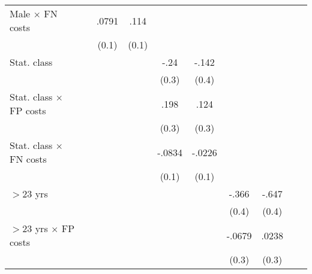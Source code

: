 \begin{table}[htbp]
\begin{tabular}{l*{9}{c}}
Male $\times$ FN costs&                  &    .0791         &     .114         &                  &                  &                  &                  &                  &                  \\
                &                  &    (0.1)         &    (0.1)         &                  &                  &                  &                  &                  &                  \\
Stat. class     &                  &                  &                  &     -.24         &    -.142         &                  &                  &                  &                  \\
                &                  &                  &                  &    (0.3)         &    (0.4)         &                  &                  &                  &                  \\
Stat. class $\times$ FP costs&                  &                  &                  &     .198         &     .124         &                  &                  &                  &                  \\
                &                  &                  &                  &    (0.3)         &    (0.3)         &                  &                  &                  &                  \\
Stat. class $\times$ FN costs&                  &                  &                  &   -.0834         &   -.0226         &                  &                  &                  &                  \\
                &                  &                  &                  &    (0.1)         &    (0.1)         &                  &                  &                  &                  \\
$>$23 yrs       &                  &                  &                  &                  &                  &    -.366         &    -.647\sym{*}  &                  &                  \\
                &                  &                  &                  &                  &                  &    (0.4)         &    (0.4)         &                  &                  \\
$>$23 yrs $\times$ FP costs&                  &                  &                  &                  &                  &   -.0679         &    .0238         &                  &                  \\
                &                  &                  &                  &                  &                  &    (0.3)         &    (0.3)         &                  &                  \\

\end{tabular}
\end{table}
